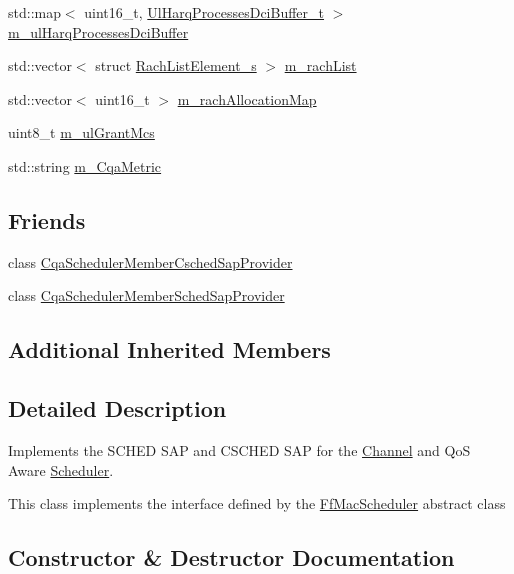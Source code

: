 \begin{DoxyCompactItemize}
std\+::map$<$ uint16\+\_\+t, \hyperlink{namespacens3_a042cbd6bf67e73911cba35b8c070223d}{Ul\+Harq\+Processes\+Dci\+Buffer\+\_\+t} $>$ \hyperlink{classns3_1_1CqaFfMacScheduler_a9af9c203c1b5fc43336988caf2294562}{m\+\_\+ul\+Harq\+Processes\+Dci\+Buffer}
\item 
std\+::vector$<$ struct \hyperlink{structns3_1_1RachListElement__s}{Rach\+List\+Element\+\_\+s} $>$ \hyperlink{classns3_1_1CqaFfMacScheduler_a8acbb79b06264ecc897614a20f77a3ad}{m\+\_\+rach\+List}
\item 
std\+::vector$<$ uint16\+\_\+t $>$ \hyperlink{classns3_1_1CqaFfMacScheduler_a813fe1147a11b3b5c34d9a345535a920}{m\+\_\+rach\+Allocation\+Map}
\item 
uint8\+\_\+t \hyperlink{classns3_1_1CqaFfMacScheduler_a6ecc5189910f7224f44baf74d8fa8684}{m\+\_\+ul\+Grant\+Mcs}
\item 
std\+::string \hyperlink{classns3_1_1CqaFfMacScheduler_aed5322f441dd060a332fe6e34c0d7d7c}{m\+\_\+\+Cqa\+Metric}
\end{DoxyCompactItemize}
\subsection*{Friends}
\begin{DoxyCompactItemize}
\item 
class \hyperlink{classns3_1_1CqaFfMacScheduler_a98a42d2ed30c27404f079a56e9dfddc1}{Cqa\+Scheduler\+Member\+Csched\+Sap\+Provider}
\item 
class \hyperlink{classns3_1_1CqaFfMacScheduler_ae6872e0ddfeba723210e403d58b41ee0}{Cqa\+Scheduler\+Member\+Sched\+Sap\+Provider}
\end{DoxyCompactItemize}
\subsection*{Additional Inherited Members}


\subsection{Detailed Description}
Implements the S\+C\+H\+ED S\+AP and C\+S\+C\+H\+ED S\+AP for the \hyperlink{classns3_1_1Channel}{Channel} and QoS Aware \hyperlink{classns3_1_1Scheduler}{Scheduler}. 

This class implements the interface defined by the \hyperlink{classns3_1_1FfMacScheduler}{Ff\+Mac\+Scheduler} abstract class 

\subsection{Constructor \& Destructor Documentation}
